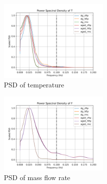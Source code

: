\begin{multicols}{2}
       \begin{figure}[H]
        \centering
        \includegraphics[width=0.48\textwidth]{./figs/bfr_smth/test_psd/T.png}
        \caption{PSD of temperature}
       \end{figure}

       \begin{figure}[H]
        \centering
        \includegraphics[width=0.48\textwidth]{./figs/bfr_smth/test_psd/F.png}
        \caption{PSD of mass flow rate}
       \end{figure}
\end{multicols}
